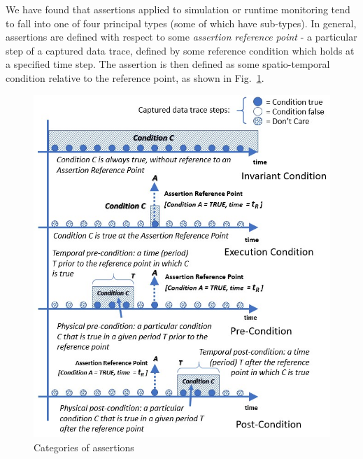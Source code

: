 We have found that assertions applied to simulation or runtime monitoring tend to fall into one of four principal types (some of which have sub-types). In general, assertions are defined with respect to some \emph{assertion reference point} - a particular step of a captured data trace, defined by some reference condition which holds at a specified time step. The assertion is then defined as some spatio-temporal condition relative to the reference point, as shown in Fig.~\ref{fig:categories_of_assertions}.

\begin{figure}[h!]
    \centering
    \includegraphics[width=0.98\linewidth]{../other/figures/Assertion Categories Figure.png}
    \caption{Categories of assertions}
    \label{fig:categories_of_assertions}
\end{figure}


